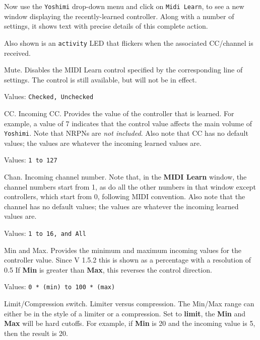    Now use the \texttt{Yoshimi} drop-down menu
   and click on \texttt{Midi Learn}, to see a new window displaying the
   recently-learned controller. Along with a number of settings, it shows text
   with precise details of this complete
   action.

   Also shown is an \texttt{activity} LED that flickers when the associated
   CC/channel is received.

   \setcounter{ItemCounter}{0}      %

   Mute.
   Disables the MIDI Learn control specified by the corresponding line of
   settings.  The control is still available, but will not be in effect.

   Values: \texttt{Checked, Unchecked}

   CC.
   Incoming CC.
   Provides the value of the controller that is learned.
   For example, a value of 7 indicates that the control value affects the main
   volume of \texttt{Yoshimi}.
   Note that NRPNs are \textsl{not included}.
   Also note that CC has no default values; the values are whatever the
   incoming learned values are.

   Values: \texttt{1 to 127}

   Chan.
   Incoming channel number.
   Note that, in the \textbf{MIDI Learn} window, the channel numbers start
   from 1,  as do all the other numbers in that window except controllers, which
   start from 0, following MIDI convention.
   Also note that the channel has no default values; the values are whatever the
   incoming learned values are.

   Values: \texttt{1 to 16, and All}

   Min and Max.
   Provides the minimum and maximum incoming values for the controller value.
   Since V 1.5.2 this is shown as a percentage with a resolution of 0.5
   If \textbf{Min} is greater than \textbf{Max}, this reverses the control
   direction.

   Values: \texttt{0 * (min) to 100 * (max)}

   Limit/Compression switch.
   Limiter versus compression.
   The Min/Max range can either be in the style of a limiter or a compression.
   Set to \textbf{limit}, the \textbf{Min} and \textbf{Max} will be hard cutoffs.
   For example, if \textbf{Min} is 20 and the incoming value is 5, then the
   result is 20.
   
